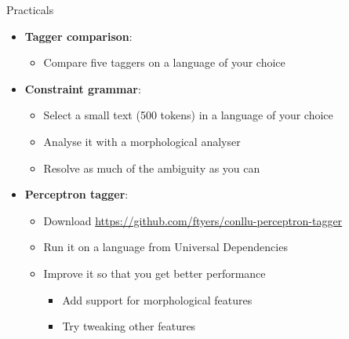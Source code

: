 \documentclass{beamer}
\begin{document}

 

\begin{frame}{Practicals}

\begin{itemize}
  \item \textbf{Tagger comparison}:
  \begin{itemize}
     \item Compare five taggers on a language of your choice
  \end{itemize}
  \item \textbf{Constraint grammar}: 
  \begin{itemize}
     \item Select a small text (500 tokens) in a language of your choice
     \item Analyse it with a morphological analyser
     \item Resolve as much of the ambiguity as you can
  \end{itemize}
  \item \textbf{Perceptron tagger}:
  \begin{itemize}
     \item Download \url{https://github.com/ftyers/conllu-perceptron-tagger}
     \item Run it on a language from Universal Dependencies
     \item Improve it so that you get better performance
     \begin{itemize}
       \item Add support for morphological features
       \item Try tweaking other features
     \end{itemize}
  \end{itemize}
\end{itemize}

\end{frame}
\end{document}
